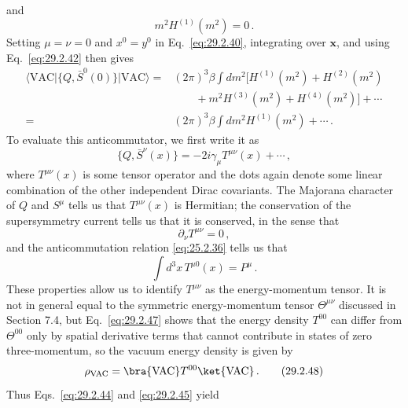 and
\begin{equation}
  m^2H^{(1)}(m^2)=0\,.
  \tag{29.2.43}\label{eq:29.2.43}
\end{equation}
Setting \(\mu=\nu=0\) and \(x^0=y^0\) in Eq.~\eqref{eq:29.2.40},
integrating over \(\mathbf x\), and using Eq.~\eqref{eq:29.2.42} then
gives
\begin{equation}
  \begin{aligned}
  \langle\mathrm{VAC}\lvert
  \{Q,\bar S^0(0)\}\rvert\mathrm{VAC}\rangle
  ={}&(2\pi)^3\beta\int dm^2
  \bigl[
    H^{(1)}(m^2)+H^{(2)}(m^2)
  \\
  &\qquad
    +m^2H^{(3)}(m^2)+H^{(4)}(m^2)
  \bigr]
  +\cdots
  \\
  ={}&(2\pi)^3\beta\int dm^2H^{(1)}(m^2)+\cdots\,.
  \end{aligned}
  \tag{29.2.44}\label{eq:29.2.44}
\end{equation}
To evaluate this anticommutator, we first write it as
\begin{equation}
  \{Q,\bar S^\nu(x)\}
  =-2i\gamma_\mu T^{\mu\nu}(x)+\cdots\,,
  \tag{29.2.45}\label{eq:29.2.45}
\end{equation}
where \(T^{\mu\nu}(x)\) is some tensor operator and the dots again denote
some linear combination of the other independent Dirac covariants. The
Majorana character of \(Q\) and \(S^\mu\) tells us that \(T^{\mu\nu}(x)\)
is Hermitian; the conservation of the supersymmetry current tells us that
it is conserved, in the sense that
\begin{equation}
  \partial_\nu T^{\mu\nu}=0\,,
  \tag{29.2.46}\label{eq:29.2.46}
\end{equation}
and the anticommutation relation \eqref{eq:25.2.36} tells us that
\begin{equation}
  \int d^3x\,T^{\mu0}(x)=P^\mu\,.
  \tag{29.2.47}\label{eq:29.2.47}
\end{equation}
These properties allow us to identify \(T^{\mu\nu}\) as the
energy-momentum tensor. It is not in general equal to the symmetric
energy-momentum tensor \(\Theta^{\mu\nu}\) discussed in Section 7.4, but
Eq.~\eqref{eq:29.2.47} shows that the energy density \(T^{00}\) can
differ from \(\Theta^{00}\) only by spatial derivative terms that cannot
contribute in states of zero three-momentum, so the vacuum energy density
is given by
\begin{equation}
  \rho_{\mathrm{VAC}}
  =\bra{\mathrm{VAC}} T^{00}\ket{\mathrm{VAC}}\,.
  \tag{29.2.48}\label{eq:29.2.48}
\end{equation}
Thus Eqs.~\eqref{eq:29.2.44} and \eqref{eq:29.2.45} yield
